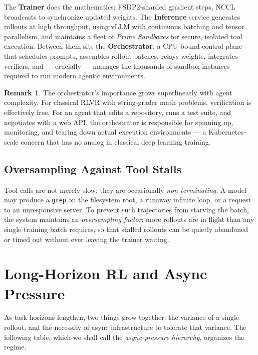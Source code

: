 \documentclass[11pt,a4paper]{article}
\theoremstyle{definition}
\newtheorem{remark}[definition]{Remark}
\theoremstyle{plain}
\begin{document}
The \textbf{Trainer} does the mathematics: FSDP2-sharded gradient steps, NCCL broadcasts to synchronize updated weights. The \textbf{Inference} service generates rollouts at high throughput, using vLLM with continuous batching and tensor parallelism, and maintains a fleet of \emph{Prime Sandboxes} for secure, isolated tool execution. Between them sits the \textbf{Orchestrator}: a CPU-bound control plane that schedules prompts, assembles rollout batches, relays weights, integrates verifiers, and --- crucially --- manages the thousands of sandbox instances required to run modern agentic environments.

\begin{remark}
The orchestrator's importance grows superlinearly with agent complexity. For classical RLVR with string-grader math problems, verification is effectively free. For an agent that edits a repository, runs a test suite, and negotiates with a web API, the orchestrator is responsible for spinning up, monitoring, and tearing down actual execution environments --- a Kubernetes-scale concern that has no analog in classical deep learning training.
\end{remark}

\subsection{Oversampling Against Tool Stalls}

Tool calls are not merely slow; they are occasionally \emph{non-terminating}. A model may produce a \texttt{grep} on the filesystem root, a runaway infinite loop, or a request to an unresponsive server. To prevent such trajectories from starving the batch, the system maintains an \emph{oversampling factor}: more rollouts are in flight than any single training batch requires, so that stalled rollouts can be quietly abandoned or timed out without ever leaving the trainer waiting.

\section{Long-Horizon RL and Async Pressure}

As task horizons lengthen, two things grow together: the variance of a single rollout, and the necessity of async infrastructure to tolerate that variance. The following table, which we shall call the \emph{async-pressure hierarchy}, organizes the regime.
\end{document}

